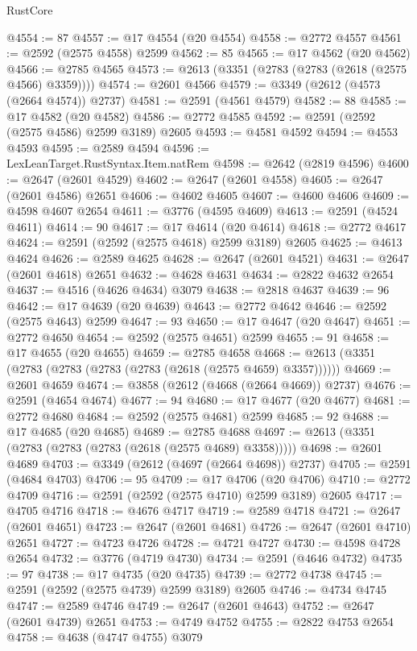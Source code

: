 \begin{lexlean}{RustCore}
\begin{coremodule}
@4554 := 87
@4557 := @17 @4554 (@20 @4554)
@4558 := @2772 @4557
@4561 := @2592 (@2575 @4558) @2599
@4562 := 85
@4565 := @17 @4562 (@20 @4562)
@4566 := @2785 @4565
@4573 := @2613 (@3351 (@2783 (@2783 (@2618 (@2575 @4566) @3359))))
@4574 := @2601 @4566
@4579 := @3349 (@2612 (@4573 (@2664 @4574)) @2737)
@4581 := @2591 (@4561 @4579)
@4582 := 88
@4585 := @17 @4582 (@20 @4582)
@4586 := @2772 @4585
@4592 := @2591 (@2592 (@2575 @4586) @2599 @3189) @2605
@4593 := @4581 @4592
@4594 := @4553 @4593
@4595 := @2589 @4594
@4596 := LexLeanTarget.RustSyntax.Item.natRem
@4598 := @2642 (@2819 @4596)
@4600 := @2647 (@2601 @4529)
@4602 := @2647 (@2601 @4558)
@4605 := @2647 (@2601 @4586) @2651
@4606 := @4602 @4605
@4607 := @4600 @4606
@4609 := @4598 @4607 @2654
@4611 := @3776 (@4595 @4609)
@4613 := @2591 (@4524 @4611)
@4614 := 90
@4617 := @17 @4614 (@20 @4614)
@4618 := @2772 @4617
@4624 := @2591 (@2592 (@2575 @4618) @2599 @3189) @2605
@4625 := @4613 @4624
@4626 := @2589 @4625
@4628 := @2647 (@2601 @4521)
@4631 := @2647 (@2601 @4618) @2651
@4632 := @4628 @4631
@4634 := @2822 @4632 @2654
@4637 := @4516 (@4626 @4634) @3079
@4638 := @2818 @4637
@4639 := 96
@4642 := @17 @4639 (@20 @4639)
@4643 := @2772 @4642
@4646 := @2592 (@2575 @4643) @2599
@4647 := 93
@4650 := @17 @4647 (@20 @4647)
@4651 := @2772 @4650
@4654 := @2592 (@2575 @4651) @2599
@4655 := 91
@4658 := @17 @4655 (@20 @4655)
@4659 := @2785 @4658
@4668 := @2613 (@3351 (@2783 (@2783 (@2783 (@2783 (@2618 (@2575 @4659) @3357))))))
@4669 := @2601 @4659
@4674 := @3858 (@2612 (@4668 (@2664 @4669)) @2737)
@4676 := @2591 (@4654 @4674)
@4677 := 94
@4680 := @17 @4677 (@20 @4677)
@4681 := @2772 @4680
@4684 := @2592 (@2575 @4681) @2599
@4685 := 92
@4688 := @17 @4685 (@20 @4685)
@4689 := @2785 @4688
@4697 := @2613 (@3351 (@2783 (@2783 (@2783 (@2618 (@2575 @4689) @3358)))))
@4698 := @2601 @4689
@4703 := @3349 (@2612 (@4697 (@2664 @4698)) @2737)
@4705 := @2591 (@4684 @4703)
@4706 := 95
@4709 := @17 @4706 (@20 @4706)
@4710 := @2772 @4709
@4716 := @2591 (@2592 (@2575 @4710) @2599 @3189) @2605
@4717 := @4705 @4716
@4718 := @4676 @4717
@4719 := @2589 @4718
@4721 := @2647 (@2601 @4651)
@4723 := @2647 (@2601 @4681)
@4726 := @2647 (@2601 @4710) @2651
@4727 := @4723 @4726
@4728 := @4721 @4727
@4730 := @4598 @4728 @2654
@4732 := @3776 (@4719 @4730)
@4734 := @2591 (@4646 @4732)
@4735 := 97
@4738 := @17 @4735 (@20 @4735)
@4739 := @2772 @4738
@4745 := @2591 (@2592 (@2575 @4739) @2599 @3189) @2605
@4746 := @4734 @4745
@4747 := @2589 @4746
@4749 := @2647 (@2601 @4643)
@4752 := @2647 (@2601 @4739) @2651
@4753 := @4749 @4752
@4755 := @2822 @4753 @2654
@4758 := @4638 (@4747 @4755) @3079

\end{coremodule}
\end{lexlean}
